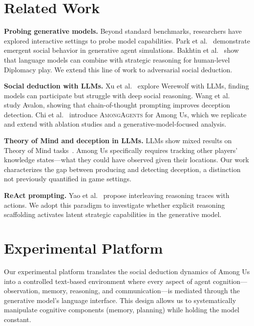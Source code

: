 \documentclass{article}
\begin{document}
\section{Related Work}

\textbf{Probing generative models.}
Beyond standard benchmarks, researchers have explored interactive settings to probe model capabilities. Park et al.~\cite{park2023generative} demonstrate emergent social behavior in generative agent simulations. Bakhtin et al.~\cite{bakhtin2022diplomacy} show that language models can combine with strategic reasoning for human-level Diplomacy play. We extend this line of work to adversarial social deduction.

\textbf{Social deduction with LLMs.}
Xu et al.~\cite{xu2023werewolf} explore Werewolf with LLMs, finding models can participate but struggle with deep social reasoning. Wang et al.~\cite{wang2023avalon} study Avalon, showing that chain-of-thought prompting improves deception detection. Chi et al.~\cite{chi2024amongagents} introduce \textsc{AmongAgents} for Among Us, which we replicate and extend with ablation studies and a generative-model-focused analysis.

\textbf{Theory of Mind and deception in LLMs.}
LLMs show mixed results on Theory of Mind tasks~\cite{park2023generative}. Among Us specifically requires tracking other players' knowledge states---what they could have observed given their locations. Our work characterizes the gap between producing and detecting deception, a distinction not previously quantified in game settings.

\textbf{ReAct prompting.}
Yao et al.~\cite{yao2023react} propose interleaving reasoning traces with actions. We adopt this paradigm to investigate whether explicit reasoning scaffolding activates latent strategic capabilities in the generative model.

\section{Experimental Platform}

Our experimental platform translates the social deduction dynamics of Among Us into a controlled text-based environment where every aspect of agent cognition---observation, memory, reasoning, and communication---is mediated through the generative model's language interface. This design allows us to systematically manipulate cognitive components (memory, planning) while holding the model constant.
\end{document}
